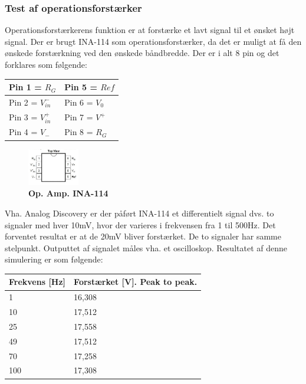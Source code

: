 \subsubsection{Test af operationsforstærker} 
Operationsforstærkerens funktion er at forstærke et lavt signal til et ønsket højt signal. Der er brugt INA-114 som operationsforstærker, da det er muligt at få den ønskede forstærkning ved den ønskede båndbredde. Der er i alt 8 pin og det forklares som følgende:
\begin{table}[H]
\label{tab:tabel2}
\begin{tabular}{| l | l |}
   \hline
   Pin 1 = $R_{G}$ & Pin 5 = $Ref$ \\ \hline
   Pin 2 = $V_{in}^{-}$ & Pin 6 = $V_{0}$\\ \hline
   Pin 3 = $V_{in}^{+}$ & Pin 7 = $V^{+}$\\ \hline
   Pin 4 = $V_{-}$ & Pin 8 = $R_{G}$\\ \hline
\end{tabular}
\end{table}
\begin{figure}[H]
\includegraphics[width =0.2\textwidth , center]{billeder/ina_114}
\caption{\textbf{Op. Amp. INA-114}}
\end{figure}
Vha. Analog Discovery er der påført INA-114 et differentielt signal dvs. to signaler med hver 10mV, hvor der varieres i frekvensen fra 1 til 500Hz. Det forventet resultat er at de 20mV bliver forstærket. De to signaler har samme stelpunkt. Outputtet af signalet måles vha. et oscilloskop. Resultatet af denne simulering er som følgende:
\begin{table}[H]
\label{tab:tabel2}
\begin{tabular}{| l | l |}
   \hline
   Frekvens [Hz] & Forstærket [V]. Peak to peak.  \\ \hline
   1 & 16,308 \\ \hline
   10 & 17,512\\ \hline
   25 & 17,558 \\ \hline
   49 & 17,512 \\\hline
   70 & 17,258 \\\hline
  100 & 17,308 \\\hline
\end{tabular}
\end{table}
